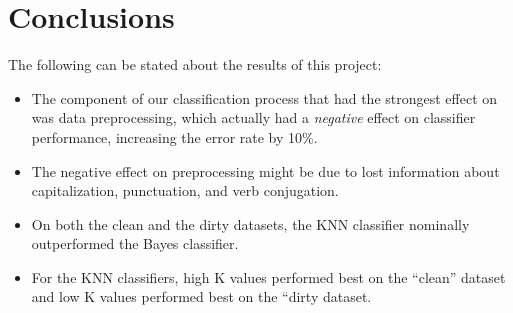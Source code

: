 \section{Conclusions}
The following can be stated about the results of this project:
\begin{itemize}
\item The component of our classification process that had the strongest effect on was data preprocessing, which actually had a \textit{negative} effect on classifier performance, increasing the error rate by 10\%.
\item The negative effect on preprocessing might be due to lost information about capitalization, punctuation, and verb conjugation.
\item On both the clean and the dirty datasets, the KNN classifier nominally outperformed the Bayes classifier.
\item For the KNN classifiers, high K values performed best on the ``clean'' dataset and low K values performed best on the ``dirty dataset.
\end{itemize}


